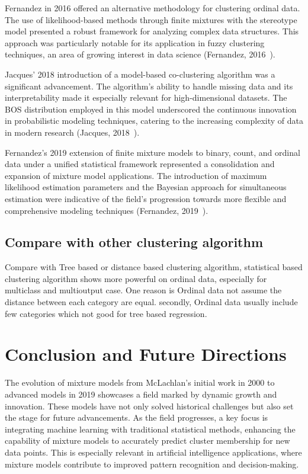 \documentclass{article}
\begin{document}
Fernandez in 2016 offered an alternative methodology for clustering ordinal data. The use of likelihood-based methods through finite mixtures with the stereotype model presented a robust framework for analyzing complex data structures. This approach was particularly notable for its application in fuzzy clustering techniques, an area of growing interest in data science (Fernandez, 2016~\cite{fernandez2016mixture}).

Jacques' 2018 introduction of a model-based co-clustering algorithm was a significant advancement. The algorithm's ability to handle missing data and its interpretability made it especially relevant for high-dimensional datasets. The BOS distribution employed in this model underscored the continuous innovation in probabilistic modeling techniques, catering to the increasing complexity of data in modern research (Jacques, 2018~\cite{jacques2018model}).

Fernandez's 2019 extension of finite mixture models to binary, count, and ordinal data under a unified statistical framework represented a consolidation and expansion of mixture model applications. The introduction of maximum likelihood estimation parameters and the Bayesian approach for simultaneous estimation were indicative of the field's progression towards more flexible and comprehensive modeling techniques (Fernandez, 2019~\cite{fernandez2019finite}).

\subsection*{Compare with other clustering algorithm}

Compare with Tree based or distance based clustering algorithm, statistical based clustering algorithm shows more powerful on ordinal data, especially for multiclass and multioutput case.
One reason is Ordinal data not assume the distance between each category are equal.
secondly, Ordinal data usually include few categories which not good for tree based regression.

\section{Conclusion and Future Directions}

The evolution of mixture models from McLachlan's initial work in 2000 to advanced models in 2019 showcases a field marked by dynamic growth and innovation. These models have not only solved historical challenges but also set the stage for future advancements. As the field progresses, a key focus is integrating machine learning with traditional statistical methods, enhancing the capability of mixture models to accurately predict cluster membership for new data points. This is especially relevant in artificial intelligence applications, where mixture models contribute to improved pattern recognition and decision-making.
\end{document}
